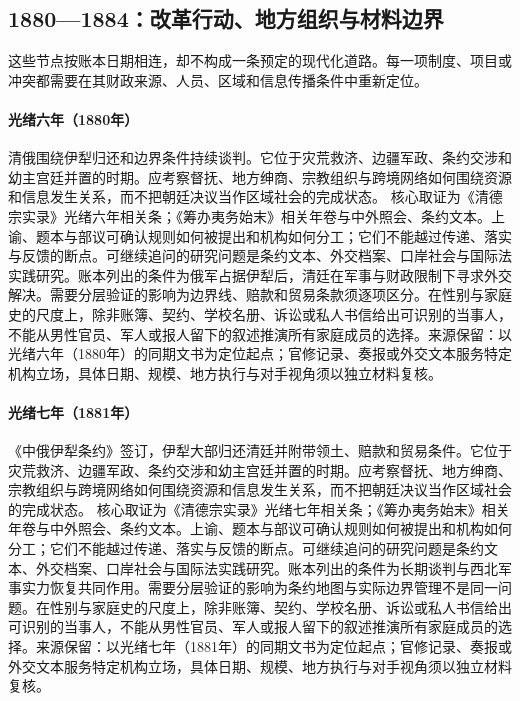 \subsection{1880—1884：改革行动、地方组织与材料边界}
这些节点按账本日期相连，却不构成一条预定的现代化道路。每一项制度、项目或冲突都需要在其财政来源、人员、区域和信息传播条件中重新定位。
\hypertarget{public:EQ-1880-ILI-NEGOTIATIONS}{}\paragraph{光绪六年（1880年）}清俄围绕伊犁归还和边界条件持续谈判。它位于灾荒救济、边疆军政、条约交涉和幼主宫廷并置的时期。应考察督抚、地方绅商、宗教组织与跨境网络如何围绕资源和信息发生关系，而不把朝廷决议当作区域社会的完成状态。 核心取证为《清德宗实录》光绪六年相关条；《筹办夷务始末》相关年卷与中外照会、条约文本。上谕、题本与部议可确认规则如何被提出和机构如何分工；它们不能越过传递、落实与反馈的断点。可继续追问的研究问题是条约文本、外交档案、口岸社会与国际法实践研究。账本列出的条件为俄军占据伊犁后，清廷在军事与财政限制下寻求外交解决。需要分层验证的影响为边界线、赔款和贸易条款须逐项区分。在性别与家庭史的尺度上，除非账簿、契约、学校名册、诉讼或私人书信给出可识别的当事人，不能从男性官员、军人或报人留下的叙述推演所有家庭成员的选择。来源保留：以光绪六年（1880年）的同期文书为定位起点；官修记录、奏报或外交文本服务特定机构立场，具体日期、规模、地方执行与对手视角须以独立材料复核。
\hypertarget{public:EQ-1881-SAINT-PETERSBURG-TREATY}{}\paragraph{光绪七年（1881年）}《中俄伊犁条约》签订，伊犁大部归还清廷并附带领土、赔款和贸易条件。它位于灾荒救济、边疆军政、条约交涉和幼主宫廷并置的时期。应考察督抚、地方绅商、宗教组织与跨境网络如何围绕资源和信息发生关系，而不把朝廷决议当作区域社会的完成状态。 核心取证为《清德宗实录》光绪七年相关条；《筹办夷务始末》相关年卷与中外照会、条约文本。上谕、题本与部议可确认规则如何被提出和机构如何分工；它们不能越过传递、落实与反馈的断点。可继续追问的研究问题是条约文本、外交档案、口岸社会与国际法实践研究。账本列出的条件为长期谈判与西北军事实力恢复共同作用。需要分层验证的影响为条约地图与实际边界管理不是同一问题。在性别与家庭史的尺度上，除非账簿、契约、学校名册、诉讼或私人书信给出可识别的当事人，不能从男性官员、军人或报人留下的叙述推演所有家庭成员的选择。来源保留：以光绪七年（1881年）的同期文书为定位起点；官修记录、奏报或外交文本服务特定机构立场，具体日期、规模、地方执行与对手视角须以独立材料复核。
